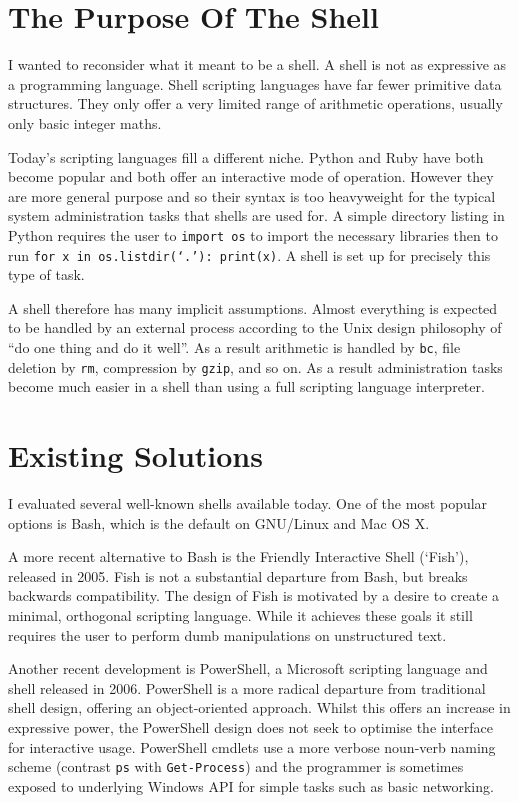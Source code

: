 \documentclass[12pt,twoside,notitlepage]{report}
\begin{document}
\section{The Purpose Of The Shell}
I wanted to reconsider what it meant to be a shell. A shell is not as
expressive as a programming language. Shell scripting languages have
far fewer primitive data structures. They only offer a very limited
range of arithmetic operations, usually only basic integer maths.

Today's scripting languages fill a different niche. Python and Ruby
have both become popular and both offer an interactive mode of
operation. However they are more general purpose and so their syntax
is too heavyweight for the typical system administration tasks that
shells are used for. A simple directory listing in Python requires the
user to {\tt import os} to import the necessary libraries then to run
{\tt for x in os.listdir(`.'): print(x)}. A shell is set up for
precisely this type of task.

A shell therefore has many implicit assumptions. Almost everything is
expected to be handled by an external process according to the Unix
design philosophy of ``do one thing and do it well''. As a result
arithmetic is handled by {\tt bc}, file deletion by {\tt rm},
compression by {\tt gzip}, and so on. As a result administration tasks
become much easier in a shell than using a full scripting language
interpreter.

\section{Existing Solutions}
I evaluated several well-known shells available today. One of the most popular
options is Bash, which is the default on GNU/Linux and Mac OS X.

A more recent alternative to Bash is the Friendly Interactive Shell (`Fish'),
released in 2005. Fish is not a substantial departure from Bash, but breaks
backwards compatibility. The design of Fish \cite{fishdesign} is motivated by a
desire to create a minimal, orthogonal scripting language. While it achieves
these goals it still requires the user to perform dumb manipulations on
unstructured text.

Another recent development is PowerShell, a Microsoft scripting
language and shell released in 2006. PowerShell is a more radical
departure from traditional shell design, offering an object-oriented
approach. Whilst this offers an increase in expressive power, the
PowerShell design does not seek to optimise the interface for
interactive usage. PowerShell cmdlets use a more verbose noun-verb
naming scheme (contrast {\tt ps} with {\tt Get-Process}) and the
programmer is sometimes exposed to underlying Windows API for simple
tasks such as basic networking.
\end{document}
